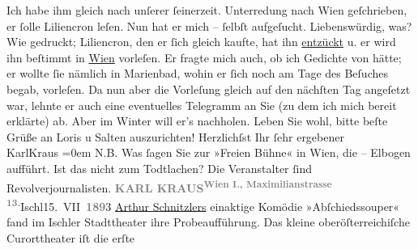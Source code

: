 \begin{ledgroupsized}[t]{13cm}
           \pstart
            Ich habe ihm gleich nach unſerer ſeinerzeit. Unterredung nach Wien geſchrieben, er ſolle {\pb}Liliencron leſen. Nun hat er mich – ſelbſt
               aufgeſucht. Liebenswürdig, was? Wie gedruckt; Liliencron, den er ſich gleich kaufte, hat ihn \uline{entzückt} u. er wird ihn beſtimmt in \uline{Wien} vorleſen. Er fragte mich auch, ob ich Gedichte von  hätte; er wollte ſie nämlich in Marienbad, wohin er ſich noch am Tage des Beſuches begab, vorleſen. Da nun
               aber die Vorleſung gleich auf den nächſten Tag angeſetzt war, lehnte er auch eine
               eventuelles Telegramm an Sie (zu dem ich mich bereit erklärte) ab. Aber im
                  Winter will er’s nachholen.\pend
           \pstart
           Leben Sie wohl, bitte beſte Grüße an Loris u Salten auszurichten!\pend
           \pstart
           Herzlichſst Ihr ſehr ergebener{\\[\baselineskip]}\spacefill\mbox{KarlKraus}\pend
           \leftskip=0em{}\pstart
           \noindent{}N.B. Was ſagen Sie zur »Freien Bühne« in Wien, die – Elbogen aufführt. Ist das nicht zum Todtlachen? Die Veranstalter ſind
                  Revolverjournalisten.\pend
           \pstart
           \noindent{}{\pb}\textcolor{gray}{\textbf{KARL KRAUS}}\hfill \substVorne{}\textsuperscript{\textcolor{gray}{\textbf{Wien I., Maximilianstrasse 13.}}}{\allowbreak}\substDazwischen{}Ischl\substHinten{}{ }15. VII \textcolor{gray}{\textbf{189}}3\pend
           \pstart
           \uline{Arthur Schnitzlers} einaktige Komödie »Abſchiedssouper« fand im Ischler Stadttheater ihre Probeaufführung. Das kleine oberöſterreichiſche Curorttheater iſt die erſte

\end{ledgroupsized}
